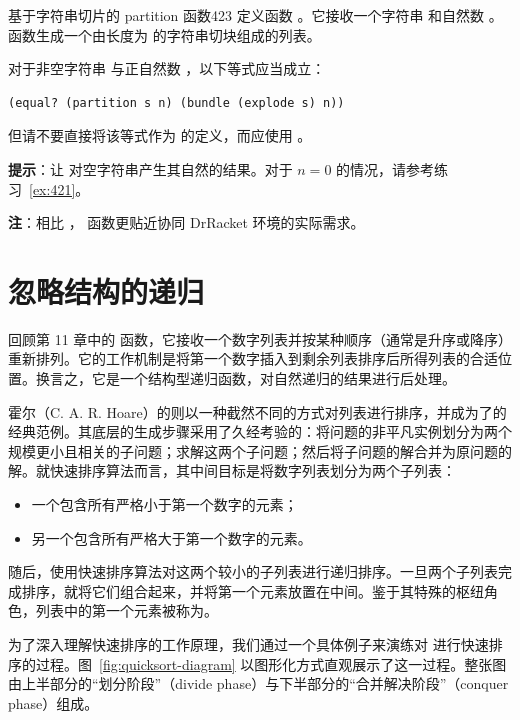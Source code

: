 \begin{exercise}{基于字符串切片的 partition 函数}{423}\label{ex:423}
定义函数 。它接收一个字符串  和自然数 。函数生成一个由长度为  的字符串切块组成的列表。

对于非空字符串  与正自然数 ，以下等式应当成立：
\begin{lstlisting}[language=BSL]
(equal? (partition s n) (bundle (explode s) n))
\end{lstlisting}
但请不要直接将该等式作为  的定义，而应使用 。

\textbf{提示}：让  对空字符串产生其自然的结果。对于 $n = 0$ 的情况，请参考练习~\ref{ex:421}。

\textbf{注}：相比 ， 函数更贴近协同 DrRacket 环境的实际需求。
\end{exercise}

\section{忽略结构的递归}
\label{sec:25_2}

回顾第 11 章中的  函数，它接收一个数字列表并按某种顺序（通常是升序或降序）重新排列。它的工作机制是将第一个数字插入到剩余列表排序后所得列表的合适位置。换言之，它是一个结构型递归函数，对自然递归的结果进行后处理。

霍尔（C. A. R. Hoare）的则以一种截然不同的方式对列表进行排序，并成为了的经典范例。其底层的生成步骤采用了久经考验的：将问题的非平凡实例划分为两个规模更小且相关的子问题；求解这两个子问题；然后将子问题的解合并为原问题的解。就快速排序算法而言，其中间目标是将数字列表划分为两个子列表：
\begin{itemize}
  \item 一个包含所有严格小于第一个数字的元素；
  \item 另一个包含所有严格大于第一个数字的元素。
\end{itemize}
随后，使用快速排序算法对这两个较小的子列表进行递归排序。一旦两个子列表完成排序，就将它们组合起来，并将第一个元素放置在中间。鉴于其特殊的枢纽角色，列表中的第一个元素被称为。

为了深入理解快速排序的工作原理，我们通过一个具体例子来演练对  进行快速排序的过程。图~\ref{fig:quicksort-diagram} 以图形化方式直观展示了这一过程。整张图由上半部分的“划分阶段”（divide phase）与下半部分的“合并解决阶段”（conquer phase）组成。

